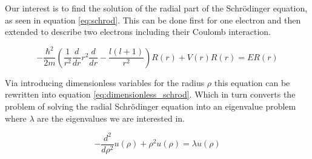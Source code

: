 Our interest is to find the solution of the radial part of the
Schrödinger equation, as seen in equation \ref{eq:schrod}.  This
can be done first for one electron and then extended to describe
two electrons including their Coulomb interaction.

\begin{equation}
    -\frac{\hbar^2}{2m}\left(
    \frac{1}{r^2}\frac{d}{dr}r^2\frac{d}{dr} -
    \frac{l(l+1)}{r^2} \right)R(r) + V(r)R(r) = ER(r)
    \label{eq:schrod}
\end{equation}

Via introducing dimensionless variables for the radius $\rho$ this
equation can be rewritten into equation
\ref{eq:dimensionless_schrod}. Which in turn converts the problem
of solving the radial Schrödinger equation into an eigenvalue
problem where $\lambda$ are the eigenvalues we are interested in.

\begin{equation}
    -\frac{d^2}{d\rho^2}u(\rho) + \rho^2u(\rho) = \lambda
    u(\rho)
    \label{eq:dimensionless_schrod}
\end{equation}
